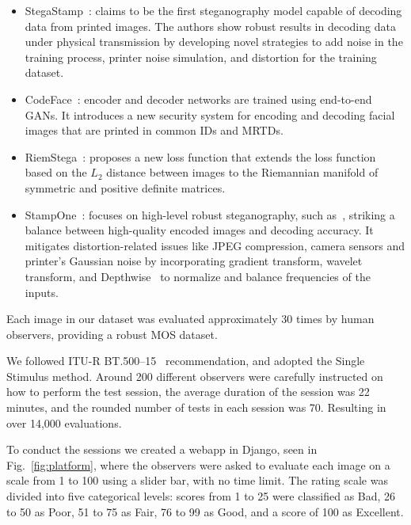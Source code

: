 \begin{itemize}
    \item StegaStamp~\cite{stegastamp2020}: claims to be the first steganography model capable of decoding data from printed images. The authors show robust results in decoding data under physical transmission by developing novel strategies to add noise in the training process, printer noise simulation, and distortion for the training dataset.
    \item CodeFace~\cite{codeface2021}: encoder and decoder networks are trained using end-to-end GANs. It introduces a new security system for encoding and decoding facial images that are printed in common IDs and MRTDs.
    \item RiemStega~\cite{cruz2025riemstega}: proposes a new loss function that extends the loss function based on the $L_2$ distance between images to the Riemannian manifold of symmetric and positive definite matrices.
    \item StampOne~\cite{stampone2023}: focuses on high-level robust steganography, such as~\cite{codeface2021, stegastamp2020}, striking a balance between high-quality encoded images and decoding accuracy. It mitigates distortion-related issues like JPEG compression, camera sensors and printer's Gaussian noise by incorporating gradient transform, wavelet transform, and Depthwise~\cite{tay2022efficient} to normalize and balance frequencies of the inputs. 
\end{itemize}

Each image in our dataset was evaluated approximately 30 times by human observers, providing a robust MOS dataset.

We followed ITU-R BT.500--15~\cite{ITU-R-BT500} recommendation, and adopted the Single Stimulus method. Around 200 different observers were carefully instructed on how to perform the test session, the average duration of the session was 22 minutes, and the rounded number of tests in each session was 70. Resulting in over 14,000 evaluations.

To conduct the sessions we created a webapp in Django, seen in Fig.~\ref{fig:platform}, where the observers were asked to evaluate each image on a scale from 1 to 100 using a slider bar, with no time limit. The rating scale was divided into five categorical levels: scores from 1 to 25 were classified as Bad, 26 to 50 as Poor, 51 to 75 as Fair, 76 to 99 as Good, and a score of 100 as Excellent.

